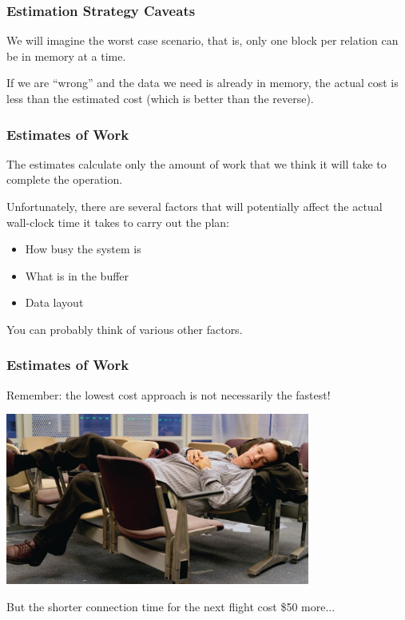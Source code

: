 \begin{frame}
\frametitle{Estimation Strategy Caveats}

We will imagine the worst case scenario, that is, only one block per relation can be in memory at a time. 

If we are ``wrong'' and the data we need is already in memory, the actual cost is less than the estimated cost (which is better than the reverse). 

\end{frame}



\begin{frame}
\frametitle{Estimates of Work}

The estimates calculate only the amount of work that we think it will take to complete the operation. 

Unfortunately, there are several factors that will potentially affect the actual wall-clock time it takes to carry out the plan:

\begin{itemize}
	\item How busy the system is
	\item What is in the buffer
	\item Data layout
\end{itemize}

You can probably think of various other factors.

\end{frame}

\begin{frame}
\frametitle{Estimates of Work}

Remember: the lowest cost approach is not necessarily the fastest!

\begin{center}
	\includegraphics[width=0.75\textwidth]{images/terminal.jpg}
\end{center}

But the shorter connection time for the next flight cost \$50 more...

\end{frame}

